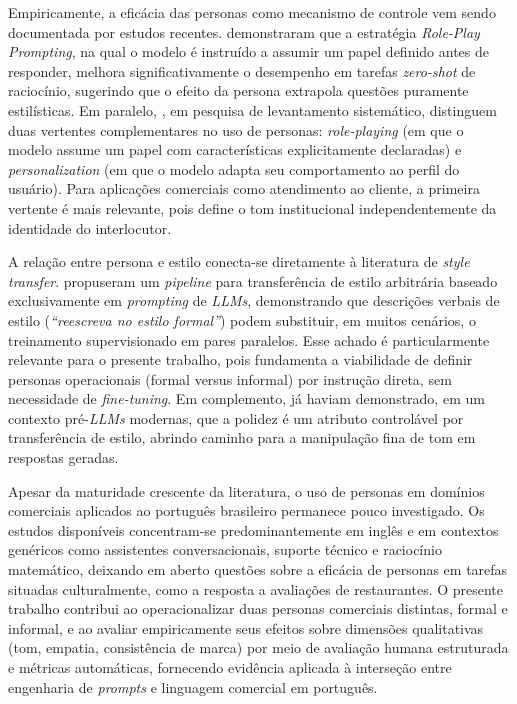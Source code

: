 \documentclass[12pt, a4paper]{article}
\numberwithin{equation}{section}
\begin{document}
Empiricamente, a eficácia das personas como mecanismo de controle vem sendo documentada por estudos recentes.  demonstraram que a estratégia \textit{Role-Play Prompting}, na qual o modelo é instruído a assumir um papel definido antes de responder, melhora significativamente o desempenho em tarefas \textit{zero-shot} de raciocínio, sugerindo que o efeito da persona extrapola questões puramente estilísticas. Em paralelo, , em pesquisa de levantamento sistemático, distinguem duas vertentes complementares no uso de personas: \textit{role-playing} (em que o modelo assume um papel com características explicitamente declaradas) e \textit{personalization} (em que o modelo adapta seu comportamento ao perfil do usuário). Para aplicações comerciais como atendimento ao cliente, a primeira vertente é mais relevante, pois define o tom institucional independentemente da identidade do interlocutor.

A relação entre persona e estilo conecta-se diretamente à literatura de \textit{style transfer}.  propuseram um \textit{pipeline} para transferência de estilo arbitrária baseado exclusivamente em \textit{prompting} de \textit{LLMs}, demonstrando que descrições verbais de estilo (\textit{``reescreva no estilo formal''}) podem substituir, em muitos cenários, o treinamento supervisionado em pares paralelos. Esse achado é particularmente relevante para o presente trabalho, pois fundamenta a viabilidade de definir personas operacionais (formal versus informal) por instrução direta, sem necessidade de \textit{fine-tuning}. Em complemento,  já haviam demonstrado, em um contexto pré-\textit{LLMs} modernas, que a polidez é um atributo controlável por transferência de estilo, abrindo caminho para a manipulação fina de tom em respostas geradas.

Apesar da maturidade crescente da literatura, o uso de personas em domínios comerciais aplicados ao português brasileiro permanece pouco investigado. Os estudos disponíveis concentram-se predominantemente em inglês e em contextos genéricos como assistentes conversacionais, suporte técnico e raciocínio matemático, deixando em aberto questões sobre a eficácia de personas em tarefas situadas culturalmente, como a resposta a avaliações de restaurantes. O presente trabalho contribui ao operacionalizar duas personas comerciais distintas, formal e informal, e ao avaliar empiricamente seus efeitos sobre dimensões qualitativas (tom, empatia, consistência de marca) por meio de avaliação humana estruturada e métricas automáticas, fornecendo evidência aplicada à interseção entre engenharia de \textit{prompts} e linguagem comercial em português.
\end{document}
